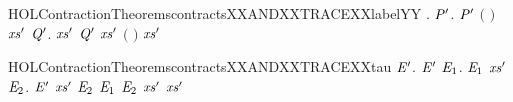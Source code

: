 \newcommand{\HOLContractionTheoremscontractsXXANDXXTRACEXXlabel}{\UseVerbatim{HOLContractionTheoremscontractsXXANDXXTRACEXXlabel}}
\begin{SaveVerbatim}{HOLContractionTheoremscontractsXXANDXXTRACEXXlabelYY}
\HOLTokenTurnstile{} \HOLSymConst{\HOLTokenForall{}} .
        \HOLSymConst{\HOLTokenImp{}}
     \HOLSymConst{\HOLTokenForall{}}  \ensuremath{\HOLBoundVar{P}\sp{\prime{}}}.
          \ensuremath{\HOLBoundVar{P}\sp{\prime{}}} \HOLSymConst{\HOLTokenConj{}}  \ensuremath{(} \ensuremath{)}  \HOLSymConst{\HOLTokenImp{}}
       \HOLSymConst{\HOLTokenExists{}}\ensuremath{\HOLBoundVar{xs}\sp{\prime{}}} \ensuremath{\HOLBoundVar{Q}\sp{\prime{}}}.
           \ensuremath{\HOLBoundVar{xs}\sp{\prime{}}} \ensuremath{\HOLBoundVar{Q}\sp{\prime{}}} \HOLSymConst{\HOLTokenConj{}}    \HOLSymConst{\HOLTokenConj{}}
          \ensuremath{\HOLBoundVar{xs}\sp{\prime{}}} \HOLSymConst{\HOLTokenLeq{}}   \HOLSymConst{\HOLTokenConj{}}  \ensuremath{(} \ensuremath{)} \ensuremath{\HOLBoundVar{xs}\sp{\prime{}}}
\end{SaveVerbatim}
\newcommand{\HOLContractionTheoremscontractsXXANDXXTRACEXXlabelYY}{\UseVerbatim{HOLContractionTheoremscontractsXXANDXXTRACEXXlabelYY}}
\begin{SaveVerbatim}{HOLContractionTheoremscontractsXXANDXXTRACEXXtau}
\HOLTokenTurnstile{} \HOLSymConst{\HOLTokenForall{}} \ensuremath{\HOLBoundVar{E}\sp{\prime{}}}.
       \ensuremath{\HOLBoundVar{E}\sp{\prime{}}} \HOLSymConst{\HOLTokenImp{}}
     \HOLSymConst{\HOLTokenForall{}} \ensuremath{\HOLBoundVar{E}\sb{\mathrm{1}}}.
          \ensuremath{\HOLBoundVar{E}\sb{\mathrm{1}}} \HOLSymConst{\HOLTokenConj{}}   \HOLSymConst{\HOLTokenImp{}}
       \HOLSymConst{\HOLTokenExists{}}\ensuremath{\HOLBoundVar{xs}\sp{\prime{}}} \ensuremath{\HOLBoundVar{E}\sb{\mathrm{2}}}.
          \ensuremath{\HOLBoundVar{E}\sp{\prime{}}} \ensuremath{\HOLBoundVar{xs}\sp{\prime{}}} \ensuremath{\HOLBoundVar{E}\sb{\mathrm{2}}} \HOLSymConst{\HOLTokenConj{}} \ensuremath{\HOLBoundVar{E}\sb{\mathrm{1}}}  \ensuremath{\HOLBoundVar{E}\sb{\mathrm{2}}} \HOLSymConst{\HOLTokenConj{}}
          \ensuremath{\HOLBoundVar{xs}\sp{\prime{}}} \HOLSymConst{\HOLTokenLeq{}}   \HOLSymConst{\HOLTokenConj{}}  \ensuremath{\HOLBoundVar{xs}\sp{\prime{}}}
\end{SaveVerbatim}
